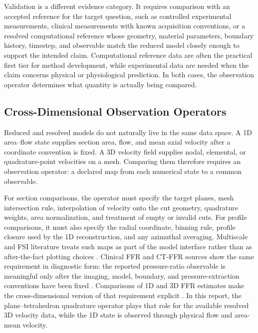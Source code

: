 Validation is a different evidence category. It requires comparison with an
accepted reference for the target question, such as controlled experimental
measurements, clinical measurements with known acquisition conventions, or a
resolved computational reference whose geometry, material parameters, boundary
history, timestep, and observable match the reduced model closely enough to
support the intended claim. Computational reference data are often the practical
first tier for method development, while experimental data are needed when the
claim concerns physical or physiological prediction. In both cases, the
observation operator determines what quantity is actually being compared.

\subsection{Cross-Dimensional Observation Operators}
\label{subsec:numerical-methods-observation-operators}

Reduced and resolved models do not naturally live in the same data space. A 1D
area--flow state supplies section area, flow, and mean axial velocity after a
coordinate convention is fixed. A 3D velocity field supplies nodal, elemental, or
quadrature-point velocities on a mesh. Comparing them therefore requires an
observation operator: a declared map from each numerical state to a common
observable.

For section comparisons, the operator must specify the target planes, mesh
intersection rule, interpolation of velocity onto the cut geometry, quadrature
weights, area normalization, and treatment of empty or invalid cuts. For profile
comparisons, it must also specify the radial coordinate, binning rule, profile
closure used by the 1D reconstruction, and any azimuthal averaging. Multiscale
and FSI literature treats such maps as part of the model interface rather than
as after-the-fact plotting choices
\cite{FormaggiaEtAl2007FSICoupling,QuarteroniVeneziani2003GeometricalMultiscale}.
Clinical FFR and CT-FFR sources show the same requirement in diagnostic form:
the reported pressure-ratio observable is meaningful only after the imaging,
model, boundary, and pressure-extraction conventions have been fixed
\cite{TebaldiEtAl2015FFROverview,NorgaardEtAl2014NXTFFRCT,ShaikhEtAl2025CTFFR}.
Comparisons of 1D and 3D FFR estimates make the cross-dimensional version of
that requirement explicit \cite{Blanco2018FFR1D3D}.
In this report, the plane--tetrahedron quadrature operator plays that role for
the available resolved 3D velocity data, while the 1D state is observed through
physical flow and area-mean velocity.

